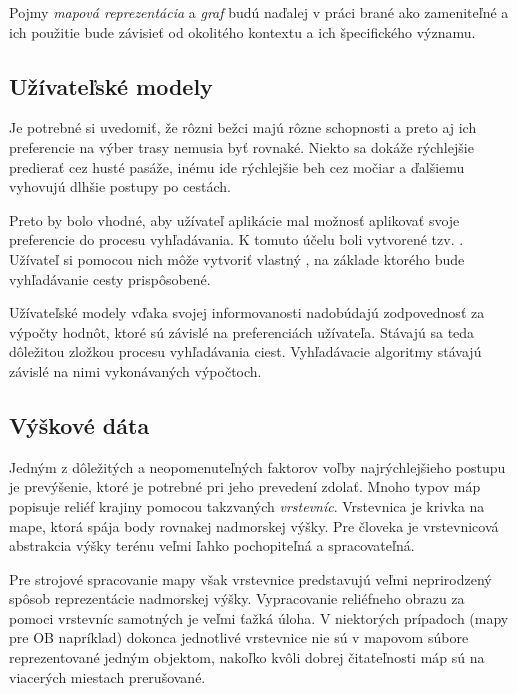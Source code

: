 Pojmy \textit{mapová reprezentácia} a \textit{graf} budú naďalej v práci brané ako zameniteľné a ich použitie bude závisieť od okolitého kontextu a ich špecifického významu.

\subsection{Užívateľské modely}\label{uzivatelske_modely}

Je potrebné si uvedomiť, že rôzni bežci majú rôzne schopnosti a preto aj ich preferencie na výber trasy nemusia byť rovnaké. Niekto sa dokáže rýchlejšie predierať cez husté pasáže, inému ide rýchlejšie beh cez močiar a ďalšiemu vyhovujú dlhšie postupy po cestách. 

Preto by bolo vhodné, aby užívateľ aplikácie mal možnosť aplikovať svoje preferencie do procesu vyhľadávania. K tomuto účelu boli vytvorené tzv. . Užívateľ si pomocou nich môže vytvoriť vlastný , na základe ktorého bude vyhľadávanie cesty prispôsobené.

Užívateľské modely vďaka svojej informovanosti nadobúdajú zodpovednosť za výpočty hodnôt, ktoré sú závislé na preferenciách užívateľa. Stávajú sa teda dôležitou zložkou procesu vyhľadávania ciest. Vyhľadávacie algoritmy stávajú závislé na nimi vykonávaných výpočtoch.

\subsection{Výškové dáta}\label{vyskove_data}

Jedným z dôležitých a neopomenuteľných faktorov voľby najrýchlejšieho postupu je prevýšenie, ktoré je potrebné pri jeho prevedení zdolať. Mnoho typov máp popisuje reliéf krajiny pomocou takzvaných \textit{vrstevníc}. Vrstevnica je krivka na mape, ktorá spája body rovnakej nadmorskej výšky. Pre človeka je vrstevnicová abstrakcia výšky terénu veľmi ľahko pochopiteľná a spracovateľná.

Pre strojové spracovanie mapy však vrstevnice predstavujú veľmi neprirodzený spôsob reprezentácie nadmorskej výšky. Vypracovanie reliéfneho obrazu za pomoci vrstevníc samotných je veľmi ťažká úloha. V niektorých prípadoch (mapy pre OB napríklad) dokonca jednotlivé vrstevnice nie sú v mapovom súbore reprezentované jedným objektom, nakoľko kvôli dobrej čitateľnosti máp sú na viacerých miestach prerušované.

